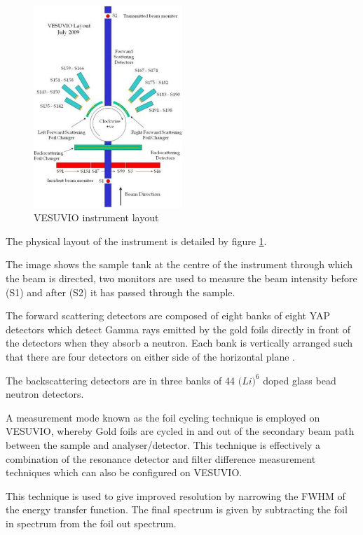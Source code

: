 \documentclass[a4paper]{article}
\begin{document}
\begin{figure}[h!]
  \centering
  \includegraphics[width=0.5\textwidth]{graphics/evs_layout_july2009.eps}
  \caption{VESUVIO instrument layout \cite{Mayers2011}}
  \label{fig:vesuvio_layout}
\end{figure}
\FloatBarrier

The physical layout of the instrument is detailed by figure
\ref{fig:vesuvio_layout}.

The image shows the sample tank at the centre of the instrument through which
the beam is directed, two monitors are used to measure the beam intensity before
(S1) and after (S2) it has passed through the sample.

The forward scattering detectors are composed of eight banks of eight \gls*{YAP}
detectors which detect Gamma rays emitted by the gold foils directly in front of
the detectors when they absorb a neutron. Each bank is vertically arranged such
that there are four detectors on either side of the horizontal plane
\cite{Mayers2011}.

The backscattering detectors are in three banks of 44 $\mathrm(Li)^{6}$ doped
glass bead neutron detectors.

A measurement mode known as the foil cycling technique \cite{Schooneveld2006} is
employed on VESUVIO, whereby Gold foils are cycled in and out of the secondary
beam path between the sample and analyser/detector. This technique is
effectively a combination of the resonance detector and filter difference
measurement techniques which can also be configured on VESUVIO.

This technique is used to give improved resolution by narrowing the \gls*{FWHM}
of the energy transfer function. The final spectrum is given by subtracting the
foil in spectrum from the foil out spectrum.
\end{document}
